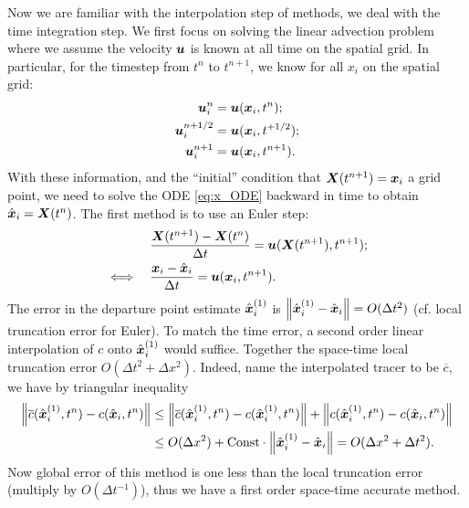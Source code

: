 \documentclass[11pt,letterpaper]{article}
\begin{document}
Now we are familiar with the interpolation step of \sml\;methods, we deal with the time integration step. We first focus on solving the linear advection problem where we assume the velocity $\boldsymbol{u}$ is known at all time on the spatial grid. In particular, for the timestep from $t^n$ to $t^{n+1}$, we know for all $x_i$ on the spatial grid:
\begin{align*}
    \boldsymbol{u}_i^{n} &= \boldsymbol{u}(\boldsymbol{x}_i,t^n);\\
    \boldsymbol{u}_i^{n+1/2} &= \boldsymbol{u}(\boldsymbol{x}_i,t^{+1/2});\\
    \boldsymbol{u}_i^{n+1} &= \boldsymbol{u}(\boldsymbol{x}_i,t^{n+1}).
\end{align*}
With these information, and the ``initial'' condition that $\boldsymbol{X}(t^{n+1}) = \boldsymbol{x}_i$ a grid point, we need to solve the ODE \eqref{eq:x_ODE} backward in time to obtain $\hat{\boldsymbol{x}}_i = \boldsymbol{X}(t^{n})$. The first method is to use an Euler step:
\begin{align*}
    &\frac{\boldsymbol{X}(t^{n+1})-\boldsymbol{X}(t^{n})}{\Delta t} = \boldsymbol{u}(\boldsymbol{X}(t^{n+1}),t^{n+1});\\
    \iff\quad &\frac{{\boldsymbol{x}}_i-\hat{\boldsymbol{x}}_i}{\Delta t} = \boldsymbol{u}(\boldsymbol{x}_i,t^{n+1}).
\end{align*}
The error in the departure point estimate $\hat{\boldsymbol{x}}^{(1)}_i$ is $\left\Vert \hat{\boldsymbol{x}}^{(1)}_i-\hat{\boldsymbol{x}}_i \right\Vert = O(\Delta t^2)$ (cf. local truncation error for Euler). To match the time error, a second order linear interpolation of $c$ onto $\hat{\boldsymbol{x}}_i^{(1)}$ would suffice. Together the space-time local truncation error $O(\Delta t^2+\Delta x^2)$. Indeed, name the interpolated tracer to be $\overline{c}$, we have by triangular inequality
\begin{align*}
    \left\Vert \overline{c}(\hat{\boldsymbol{x}}^{(1)}_i,t^n)-c(\hat{\boldsymbol{x}}_i,t^n) \right\Vert 
    &\leq \left\Vert \overline{c}(\hat{\boldsymbol{x}}^{(1)}_i,t^n)-{c}(\hat{\boldsymbol{x}}^{(1)}_i,t^n) \right\Vert+\left\Vert {c}(\hat{\boldsymbol{x}}^{(1)}_i,t^n)-c(\hat{\boldsymbol{x}}_i,t^n) \right\Vert\\
    &\leq O(\Delta x^2)+\text{Const}\cdot \left\Vert \hat{\boldsymbol{x}}^{(1)}_i-\hat{\boldsymbol{x}}_i \right\Vert = O(\Delta x^2+\Delta t^2).
\end{align*}
Now global error of this method is one less than the local truncation error (multiply by $O(\Delta t^{-1})$), thus we have a first order space-time accurate method. 
\end{document}
